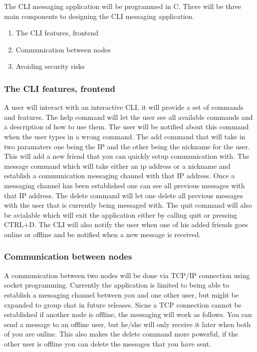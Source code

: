 \documentclass[twoside]{article}
\begin{document}
\begin{multicols}{2}
The CLI messaging application will be programmed in C. There will be three main components to designing the CLI messaging application.

\begin{enumerate}
  \item The CLI features, frontend
  \item Communication between nodes 
  \item Avoiding security risks 
\end{enumerate}


\subsubsection{The CLI features, frontend}
A user will interact with an interactive CLI, it will provide a set of commands and features. The help command will let the user see all available commands and a description of how to use them. The user 
will be notified about this command when the user types in a wrong command. The add command that will take in two paramaters one being the IP and the other 
being the nickname for the user. This will add a new friend that you can quickly setup communication with. The message command which will take either an ip address or a nickname and establish a communication messaging channel with that IP address. Once a messaging channel has been established one can see all previous messages with that IP address. The delete command will let one delete all previous messages with the user that is currently being messaged with. The quit command will also be avialable which will exit the application either 
by calling quit or pressing CTRL+D. The CLI will also notify the user when one of his added friends goes online or offline and be notified when a new message is received.
\subsubsection{Communication between nodes }
A communication between two nodes will be done via TCP/IP connection using socket programming. Currently the application is limited to being able to establish a messaging channel between you and one other user, but might be expanded to group chat in future releases. Sicne a TCP connection cannot be established if another node is offline, the messaging will work as follows. You can send a message to an offline user, but he/she will only receive it later when both of you are online. This also makes the delete command more powerful, if the other user is offline you can delete the messages that you have sent.



\end{multicols}
\end{document}
